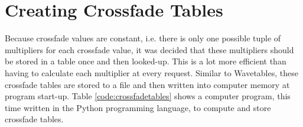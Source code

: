 \section{Creating Crossfade Tables}

Because crossfade values are constant, i.e. there is only one possible tuple of multipliers for each crossfade value, it was decided that these multipliers should be stored in a table once and then looked-up. This is a lot more efficient than having to calculate each multiplier at every request. Similar to Wavetables, these crossfade tables are stored to a file and then written into computer memory at program start-up. Table \ref{code:crossfadetables} shows a computer program, this time written in the Python programming language, to compute and store crossfade tables.

\begin{table}[hbt!]
  
  \caption{}
  \label{code:crossfadetables}
\end{table}
